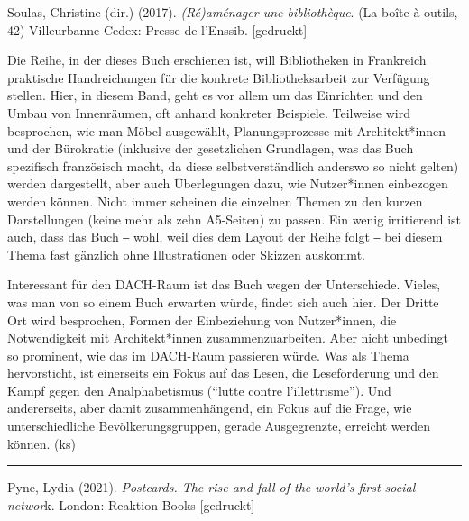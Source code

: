 \documentclass[a4paper,
fontsize=11pt,
oneside,
numbers=noperiodatend,
parskip=half-,
bibliography=totoc,
final
]{scrartcl}
\begin{document}
Soulas, Christine (dir.) (2017). \emph{(Ré)aménager une bibliothèque}.
(La boîte à outils, 42) Villeurbanne Cedex: Presse de l'Enssib.
{[}gedruckt{]}

Die Reihe, in der dieses Buch erschienen ist, will Bibliotheken in
Frankreich praktische Handreichungen für die konkrete Bibliotheksarbeit
zur Verfügung stellen. Hier, in diesem Band, geht es vor allem um das
Einrichten und den Umbau von Innenräumen, oft anhand konkreter
Beispiele. Teilweise wird besprochen, wie man Möbel ausgewählt,
Planungsprozesse mit Architekt*innen und der Bürokratie (inklusive der
gesetzlichen Grundlagen, was das Buch spezifisch französisch macht, da
diese selbstverständlich anderswo so nicht gelten) werden dargestellt,
aber auch Überlegungen dazu, wie Nutzer*innen einbezogen werden können.
Nicht immer scheinen die einzelnen Themen zu den kurzen Darstellungen
(keine mehr als zehn A5-Seiten) zu passen. Ein wenig irritierend ist
auch, dass das Buch ‒ wohl, weil dies dem Layout der Reihe folgt ‒ bei
diesem Thema fast gänzlich ohne Illustrationen oder Skizzen auskommt.

Interessant für den DACH-Raum ist das Buch wegen der Unterschiede.
Vieles, was man von so einem Buch erwarten würde, findet sich auch hier.
Der Dritte Ort wird besprochen, Formen der Einbeziehung von
Nutzer*innen, die Notwendigkeit mit Architekt*innen zusammenzuarbeiten.
Aber nicht unbedingt so prominent, wie das im DACH-Raum passieren würde.
Was als Thema hervorsticht, ist einerseits ein Fokus auf das Lesen, die
Leseförderung und den Kampf gegen den Analphabetismus (\enquote{lutte
contre l'illettrisme}). Und andererseits, aber damit zusammenhängend,
ein Fokus auf die Frage, wie unterschiedliche Bevölkerungsgruppen,
gerade Ausgegrenzte, erreicht werden können. (ks)

\begin{center}\rule{0.5\linewidth}{0.5pt}\end{center}

Pyne, Lydia (2021). \emph{Postcards. The rise and fall of the world's
first social networ}k. London: Reaktion Books {[}gedruckt{]}
\end{document}
